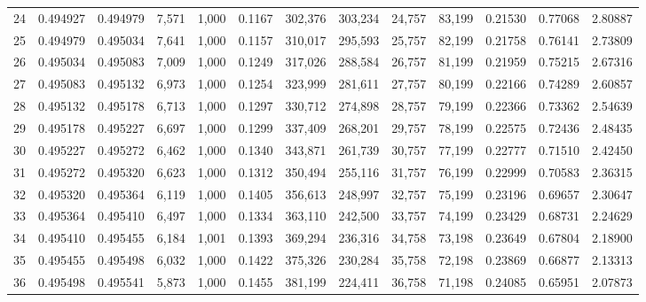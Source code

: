\begin{tabular}{rrrrrrrrrrrrr}
24  &  0.494927 &  0.494979 &   7,571 &  1,000 &                                     0.1167 &  302,376 &  303,234 &   24,757 &   83,199 &  0.21530 &  0.77068 &  2.80887 \\
25  &  0.494979 &  0.495034 &   7,641 &  1,000 &                                     0.1157 &  310,017 &  295,593 &   25,757 &   82,199 &  0.21758 &  0.76141 &  2.73809 \\
26  &  0.495034 &  0.495083 &   7,009 &  1,000 &                                     0.1249 &  317,026 &  288,584 &   26,757 &   81,199 &  0.21959 &  0.75215 &  2.67316 \\
27  &  0.495083 &  0.495132 &   6,973 &  1,000 &                                     0.1254 &  323,999 &  281,611 &   27,757 &   80,199 &  0.22166 &  0.74289 &  2.60857 \\
28  &  0.495132 &  0.495178 &   6,713 &  1,000 &                                     0.1297 &  330,712 &  274,898 &   28,757 &   79,199 &  0.22366 &  0.73362 &  2.54639 \\
29  &  0.495178 &  0.495227 &   6,697 &  1,000 &                                     0.1299 &  337,409 &  268,201 &   29,757 &   78,199 &  0.22575 &  0.72436 &  2.48435 \\
30  &  0.495227 &  0.495272 &   6,462 &  1,000 &                                     0.1340 &  343,871 &  261,739 &   30,757 &   77,199 &  0.22777 &  0.71510 &  2.42450 \\
31  &  0.495272 &  0.495320 &   6,623 &  1,000 &                                     0.1312 &  350,494 &  255,116 &   31,757 &   76,199 &  0.22999 &  0.70583 &  2.36315 \\
32  &  0.495320 &  0.495364 &   6,119 &  1,000 &                                     0.1405 &  356,613 &  248,997 &   32,757 &   75,199 &  0.23196 &  0.69657 &  2.30647 \\
33  &  0.495364 &  0.495410 &   6,497 &  1,000 &                                     0.1334 &  363,110 &  242,500 &   33,757 &   74,199 &  0.23429 &  0.68731 &  2.24629 \\
34  &  0.495410 &  0.495455 &   6,184 &  1,001 &                                     0.1393 &  369,294 &  236,316 &   34,758 &   73,198 &  0.23649 &  0.67804 &  2.18900 \\
35  &  0.495455 &  0.495498 &   6,032 &  1,000 &                                     0.1422 &  375,326 &  230,284 &   35,758 &   72,198 &  0.23869 &  0.66877 &  2.13313 \\
36  &  0.495498 &  0.495541 &   5,873 &  1,000 &                                     0.1455 &  381,199 &  224,411 &   36,758 &   71,198 &  0.24085 &  0.65951 &  2.07873 \\

\end{tabular}
